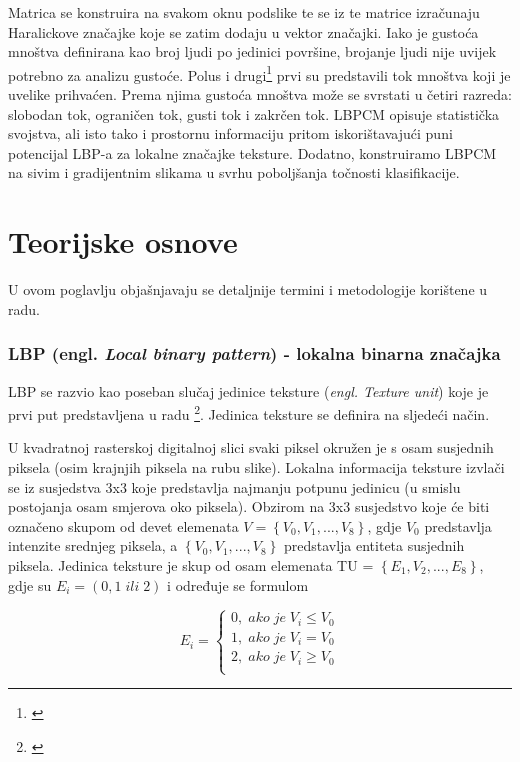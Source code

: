 \documentclass[times, utf8, zavrsni]{fer}
\begin{document}
Matrica se konstruira na svakom oknu podslike te se iz te matrice izračunaju 
Haralickove značajke koje se zatim dodaju u vektor značajki. Iako je 
gustoća mnoštva definirana kao broj ljudi po jedinici površine, 
brojanje ljudi nije uvijek potrebno za analizu gustoće. Polus i 
drugi\footnote{\cite{polus}} prvi su predstavili tok mnoštva koji je uvelike prihvaćen. 
Prema njima gustoća mnoštva može se svrstati u četiri razreda: 
slobodan tok, ograničen tok, gusti tok i zakrčen tok. 
LBPCM opisuje statistička svojstva, ali isto tako i prostornu 
informaciju pritom iskorištavajući puni potencijal LBP-a za 
lokalne značajke teksture. Dodatno, konstruiramo LBPCM na sivim i 
gradijentnim slikama u svrhu poboljšanja točnosti klasifikacije.


\chapter{Teorijske osnove}
U ovom poglavlju objašnjavaju se detaljnije termini i metodologije korištene u radu.

\subsection{LBP (engl. \textit{Local binary pattern}) - lokalna binarna značajka}

LBP se razvio kao poseban slučaj jedinice teksture (\textit{engl. Texture unit})
koje je prvi put predstavljena u radu \footnote{\cite{dong}}.
Jedinica teksture se definira na sljedeći način. 

\bigbreak

U kvadratnoj rasterskoj digitalnoj slici svaki piksel okružen je s
osam susjednih piksela (osim krajnjih piksela na rubu slike). 
Lokalna informacija teksture izvlači se iz susjedstva 3x3 koje 
predstavlja najmanju potpunu jedinicu (u smislu postojanja osam 
smjerova oko piksela). Obzirom na 3x3 susjedstvo koje će biti 
označeno skupom od devet elemenata \(V = \left\{V_0, V_1,..., V_8\right\}\),
gdje \(V_0\) predstavlja intenzite srednjeg piksela, a 
\(\left\{V_0, V_1,..., V_8\right\}\) predstavlja entiteta susjednih piksela.
Jedinica teksture je skup od osam elemenata TU = \(\left\{E_1, V_2,..., E_8\right\}\),
gdje su \(E_i = (0,1\; ili \;2)\) i određuje se formulom

\[
E_i = \left\{
\begin{matrix}
0, \; ako \; je \; V_i \le V_0 \\
1, \; ako \; je \; V_i = V_0 \\
2, \; ako \; je \; V_i \ge V_0 \\
\end{matrix}
\right.
\]
\end{document}
